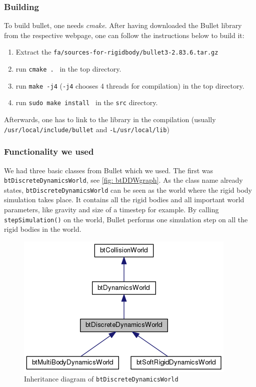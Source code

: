 \subsubsection{Building}
To build bullet, one needs \emph{cmake}\cite{CMake}. After having downloaded the Bullet library from the respective webpage, one can follow the instructions below to build it:
\begin{enumerate}
\item Extract the \verb+fa/sources-for-rigidbody/bullet3-2.83.6.tar.gz +
\item run \verb+cmake . + in the top directory.
\item run \verb+make -j4+ (\verb+-j4+ chooses 4 threads for compilation) in the top directory.
\item run \verb+sudo make install + in the \verb+src+ directory.
\end{enumerate}
Afterwards, one has to link to the library in the compilation (usually \verb+/usr/local/include/bullet+ and \verb+-L/usr/local/lib+)
\subsubsection{Functionality we used}
We had three basic classes from Bullet which we used. The first was \verb+btDiscreteDynamicsWorld+, see \autoref{fig: btDDWgraph}. As the class name already states, \verb+btDiscreteDynamicsWorld+ can be seen as the world where the rigid body simulation takes place. It contains all the rigid bodies and all important world parameters, like gravity and size of a timestep for example. By calling \verb+stepSimulation()+ on the world, Bullet performs one simulation step on all the rigid bodies in the world.

\begin{figure}
\centering
\includegraphics[scale=0.5]{img/RigidBodies/btDiscreteDynamicsWorldGraph.png}
\caption{Inheritance diagram of \texttt{btDiscreteDynamicsWorld}}
\label{fig: btDDWgraph}
\end{figure}

